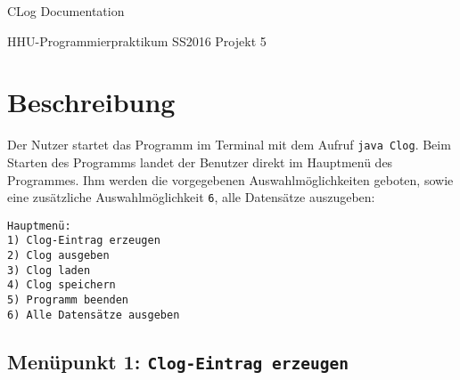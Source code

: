 \documentclass[oneside,12pt]{scrartcl}
\newcommand{\code}[1]{\texttt{#1}}
\begin{document}
\setlength{\parindent}{0pt} %
\cofoot{}
\rofoot{\pagemark}

\begin{center}
\Huge{CLog Documentation} \par
\Large{HHU-Programmierpraktikum SS2016 Projekt 5}
\end{center}

\section{Beschreibung}
Der Nutzer startet das Programm im Terminal mit dem Aufruf \code{java Clog}. Beim Starten des Programms landet der Benutzer direkt im Hauptmenü des Programmes. Ihm werden die vorgegebenen Auswahlmöglichkeiten geboten, sowie eine zusätzliche Auswahlmöglichkeit \code{6}, alle Datensätze auszugeben:

\begin{verbatim}
Hauptmenü:
1) Clog-Eintrag erzeugen
2) Clog ausgeben
3) Clog laden
4) Clog speichern
5) Programm beenden
6) Alle Datensätze ausgeben
\end{verbatim}

\subsection{Menüpunkt 1: \code{Clog-Eintrag erzeugen}}
\end{document}

